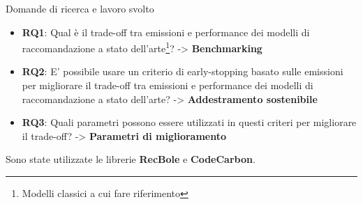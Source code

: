 \begin{frame}{Domande di ricerca e lavoro svolto}
    \begin{itemize}
        \item \textbf{RQ1}: Qual è il trade-off tra emissioni e performance dei modelli di raccomandazione a stato dell'arte\footnote{Modelli classici a cui fare riferimento}{?} -> \textbf{Benchmarking}
        \item \textbf{RQ2}: E’ possibile usare un criterio di early-stopping basato sulle emissioni per migliorare il trade-off tra emissioni e performance dei modelli di raccomandazione a stato dell’arte? -> \textbf{Addestramento sostenibile}
        \item \textbf{RQ3}: Quali parametri possono essere utilizzati in questi criteri per migliorare il trade-off? -> \textbf{Parametri di miglioramento}
    \end{itemize}

    Sono state utilizzate le librerie \textbf{RecBole} e \textbf{CodeCarbon}.
\end{frame}
